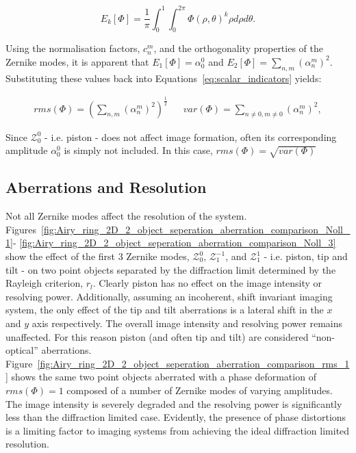 \begin{equation}\label{eq:E_functionals}
E_{k}\left[\Phi\right] = \frac{1}{\pi} \int_{0}^{1}\int_{0}^{2\pi} \Phi\left(\rho,\theta\right)^{k}\rho d\rho d\theta.
\end{equation}

Using the normalisation factors, $c_{n}^{m}$, and the orthogonality
properties of the Zernike modes, it is apparent that $E_{1}\left[\Phi\right] 
= \alpha_{0}^{0}$ and $E_{2}\left[\Phi\right] = 
\sum\limits_{n,m}{\left({\alpha_{n}^{m}}\right)^{2}}$. Substituting 
these values back into Equations~\ref{eq:scalar_indicators} yields:

\begin{align}\label{eq:scalar_indicators_new}
rms(\Phi) = \left(\sum\limits_{n,m}{\left({\alpha_{n}^{m}}\right)^{2}}\right)^{\frac{1}{2}} && 
var(\Phi) = \sum\limits_{n\ne 0,m\ne 0}{\left({\alpha_{n}^{m}}\right)^{2}},
\end{align}

Since $\mathcal{Z}_{0}^{0}$ - i.e. piston - does not affect image 
formation, often its corresponding amplitude $\alpha_{0}^{0}$ is
simply not included. In this case, $rms(\Phi) = \sqrt{var(\Phi)}$

\subsection{Aberrations and Resolution}
\label{subsec:aberrations_and_resolution}

Not all Zernike modes affect the resolution of the system. 
Figures~\ref{fig:Airy_ring_2D_2_object_seperation_aberration_comparison_Noll_1}-
\ref{fig:Airy_ring_2D_2_object_seperation_aberration_comparison_Noll_3}
show the effect of the first 3 Zernike modes, $\mathcal{Z}_{0}^{0}$, 
$\mathcal{Z}_{1}^{-1}$, and $\mathcal{Z}_{1}^{1}$ - i.e. piston, tip and 
tilt - on two point objects separated by the diffraction limit determined
by the Rayleigh criterion, $r_{l}$. Clearly piston has no effect on the 
image intensity or resolving power. Additionally, assuming an incoherent, 
shift invariant imaging system, the only effect of the tip and tilt 
aberrations is a lateral shift in the $x$ and $y$ axis respectively. The
overall image intensity and resolving power remains unaffected. For this 
reason piston (and often tip and tilt) are considered ``non-optical'' 
aberrations. 
Figure~\ref{fig:Airy_ring_2D_2_object_seperation_aberration_comparison_rms_1}
shows the same two point objects aberrated with a phase deformation of 
$rms(\Phi) = 1$ composed of a number of Zernike modes of varying 
amplitudes. The image intensity is severely degraded and the resolving
power is significantly less than the diffraction limited case. Evidently, 
the presence of phase distortions is a limiting factor to imaging systems 
from achieving the ideal diffraction limited 
resolution\cite{antonello2014optimisation,booth2014adaptive}.


